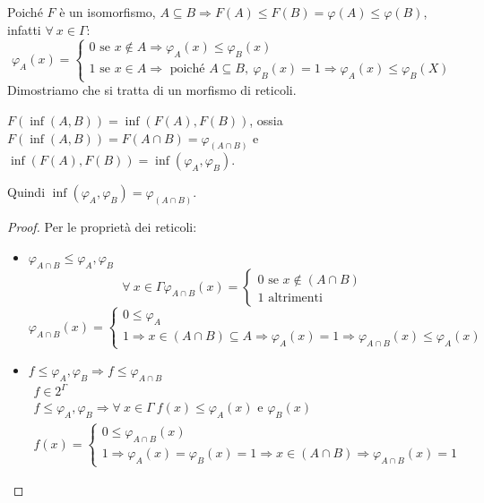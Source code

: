 Poich\'e $F$ \`e un isomorfismo, $A \subseteq B \Rightarrow F(A) \le F(B) = \varphi(A) \le \varphi(B)$, infatti $\forall \ x \in \Gamma$:
\[
\varphi_A(x) = 
\begin{cases}
0 \text{ se } x \notin A \Rightarrow \varphi_A(x) \le \varphi_B(x) \\
1 \text{ se } x \in A \Rightarrow \text{ poich\'e } A \subseteq B, \ \varphi_B(x) = 1 \Rightarrow \varphi_A(x) \le \varphi_B(X)
\end{cases}
\]
Dimostriamo che si tratta di un morfismo di reticoli.
\begin{prop}
$F(\inf(A,B)) = \inf(F(A), F(B))$, ossia $F(\inf(A,B)) = F(A \cap B) = \varphi_{(A \cap B)}$ e $\inf(F(A), F(B)) = \inf(\varphi_A, \varphi_B)$.

Quindi $\inf(\varphi_A, \varphi_B) = \varphi_{(A \cap B)}$.
\end{prop}
\begin{proof}
Per le propriet\`a dei reticoli:
\begin{itemize}
  \item $\varphi_{A \cap B} \le \varphi_A, \varphi_B$
  \[
  \forall \ x \in \Gamma \varphi_{A \cap B} (x) =
  \begin{cases}
  0 \text{ se } x \notin (A \cap B) \\
  1 \text{ altrimenti}
  \end{cases}
  \]
  \[
  \varphi_{A \cap B} (x) = 
  \begin{cases} 
  0 \le \varphi_A \\
  1 \Rightarrow x \in (A \cap B) \subseteq A \Rightarrow \varphi_A(x) = 1 \Rightarrow \varphi_{A \cap B} (x) \le \varphi_A (x)
  \end{cases}
  \]
  \item $f \le \varphi_A, \varphi_B \Rightarrow f \le \varphi_{A \cap B}$
  \begin{gather*}
  f \in 2^{\Gamma} \\
  f \le \varphi_A, \varphi_B \Rightarrow
  \forall \ x \in \Gamma \ f(x) \le 
  \varphi_A(x) 
  \text{ e } 
  \varphi_B(x) \\
  f(x) =
  \begin{cases}
  0 \le \varphi_{A \cap B} (x) \\
  1 \Rightarrow \varphi_A (x) = \varphi_B (x) = 1 \Rightarrow x \in (A \cap B) \Rightarrow \varphi_{A \cap B} (x) = 1
  \end{cases}
  \end{gather*}
\end{itemize}
\end{proof}


